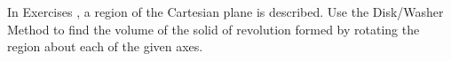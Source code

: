 {\noindent In Exercises}
{, a region of the Cartesian plane is described. Use the Disk/Washer Method to find the volume of the solid of revolution formed by rotating the region about each of the given axes.
}
